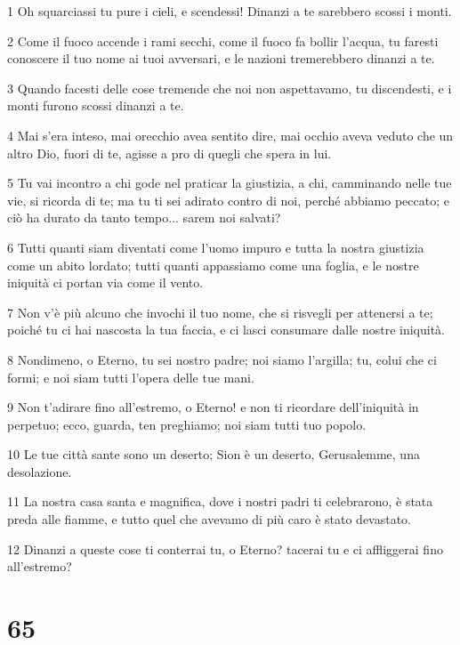 \par 1 Oh squarciassi tu pure i cieli, e scendessi! Dinanzi a te sarebbero scossi i monti.
\par 2 Come il fuoco accende i rami secchi, come il fuoco fa bollir l'acqua, tu faresti conoscere il tuo nome ai tuoi avversari, e le nazioni tremerebbero dinanzi a te.
\par 3 Quando facesti delle cose tremende che noi non aspettavamo, tu discendesti, e i monti furono scossi dinanzi a te.
\par 4 Mai s'era inteso, mai orecchio avea sentito dire, mai occhio aveva veduto che un altro Dio, fuori di te, agisse a pro di quegli che spera in lui.
\par 5 Tu vai incontro a chi gode nel praticar la giustizia, a chi, camminando nelle tue vie, si ricorda di te; ma tu ti sei adirato contro di noi, perché abbiamo peccato; e ciò ha durato da tanto tempo... sarem noi salvati?
\par 6 Tutti quanti siam diventati come l'uomo impuro e tutta la nostra giustizia come un abito lordato; tutti quanti appassiamo come una foglia, e le nostre iniquità ci portan via come il vento.
\par 7 Non v'è più alcuno che invochi il tuo nome, che si risvegli per attenersi a te; poiché tu ci hai nascosta la tua faccia, e ci lasci consumare dalle nostre iniquità.
\par 8 Nondimeno, o Eterno, tu sei nostro padre; noi siamo l'argilla; tu, colui che ci formi; e noi siam tutti l'opera delle tue mani.
\par 9 Non t'adirare fino all'estremo, o Eterno! e non ti ricordare dell'iniquità in perpetuo; ecco, guarda, ten preghiamo; noi siam tutti tuo popolo.
\par 10 Le tue città sante sono un deserto; Sion è un deserto, Gerusalemme, una desolazione.
\par 11 La nostra casa santa e magnifica, dove i nostri padri ti celebrarono, è stata preda alle fiamme, e tutto quel che avevamo di più caro è stato devastato.
\par 12 Dinanzi a queste cose ti conterrai tu, o Eterno? tacerai tu e ci affliggerai fino all'estremo?

\chapter{65}

